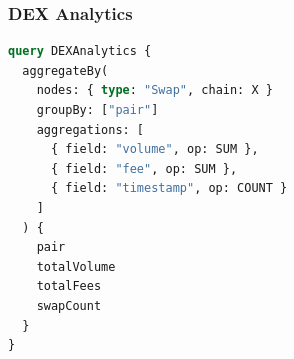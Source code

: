 \subsubsection{DEX Analytics}

\begin{lstlisting}[language=GraphQL, basicstyle=\small\ttfamily]
query DEXAnalytics {
  aggregateBy(
    nodes: { type: "Swap", chain: X }
    groupBy: ["pair"]
    aggregations: [
      { field: "volume", op: SUM },
      { field: "fee", op: SUM },
      { field: "timestamp", op: COUNT }
    ]
  ) {
    pair
    totalVolume
    totalFees
    swapCount
  }
}
\end{lstlisting}

